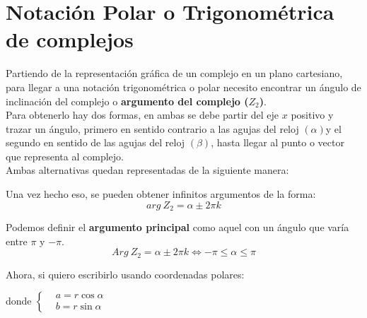 \documentclass[12pt, twocolumn]{article}
\begin{document}
\section{Notación Polar o Trigonométrica de complejos}
Partiendo de la representación gráfica de un complejo en un plano cartesiano, para llegar a una notación trigonométrica o polar necesito encontrar un ángulo de inclinación del complejo o \textbf{argumento del complejo ($Z_{2}$)}. \\ 
Para obtenerlo hay dos formas, en ambas se debe partir del eje $x$ positivo y trazar un ángulo, primero en sentido contrario a las agujas del reloj  $(\alpha)$y el segundo en sentido de las agujas del reloj $(\beta)$, hasta llegar al punto o vector que representa al complejo. \\
Ambas alternativas quedan representadas de la siguiente manera:
\begin{center}
\end{center}

Una vez hecho eso, se pueden obtener infinitos argumentos de la forma:
$$arg \ Z_{2}=\alpha \pm 2\pi k$$

Podemos definir el \textbf{argumento principal} como aquel con un ángulo que varía entre $\pi$ y $-\pi$.
$$Arg \ Z_{2}=\alpha \pm 2\pi k \Leftrightarrow -\pi\leq\alpha\leq\pi$$

Ahora, si quiero escribirlo usando coordenadas polares:
\begin{center}
\end{center}
donde $\left\{
\begin{aligned}
    &a=r\cos{\alpha}\\
    &b=r\sin{\alpha}
\end{aligned}
\right.$
\end{document}
